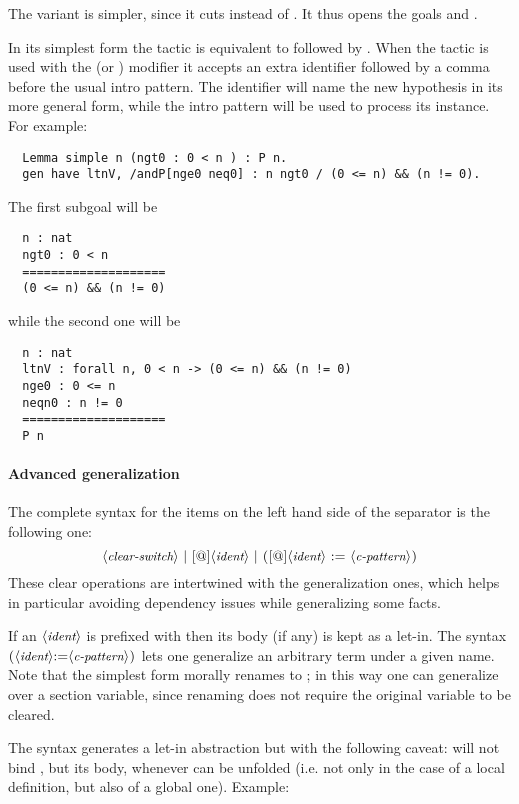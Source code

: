 The  variant is simpler, since it cuts
 instead of . It thus
opens the goals  and .

In its simplest form
the  tactic
is equivalent to  followed by .
When the  tactic
is used with the  (or ) modifier it accepts an
extra identifier followed by a comma before the usual intro pattern.
The identifier will name the new hypothesis in its more general form,
while the intro pattern will be used to process its instance.  For example:
\begin{lstlisting}
  Lemma simple n (ngt0 : 0 < n ) : P n.
  gen have ltnV, /andP[nge0 neq0] : n ngt0 / (0 <= n) && (n != 0).
\end{lstlisting}
The first subgoal will be
\begin{lstlisting}
  n : nat
  ngt0 : 0 < n
  ====================
  (0 <= n) && (n != 0)
\end{lstlisting}
while the second one will be
\begin{lstlisting}
  n : nat
  ltnV : forall n, 0 < n -> (0 <= n) && (n != 0)
  nge0 : 0 <= n
  neqn0 : n != 0
  ====================
  P n
\end{lstlisting}

\paragraph{Advanced generalization}\label{par:advancedgen}
The complete syntax for the items on the left hand side of the \C{/}
separator is the following one:
$$
\N{clear-switch}\ |\ [\C{@}]\N{ident}\ |\ \C{(}[\C{@}]\N{ident}\ \C{:=}\ \N{c-pattern}\C{)}
$$
These clear operations are intertwined with the generalization ones, which
helps in particular avoiding dependency issues while generalizing some facts.

\noindent
If an $\langle\mbox{\itshape\rmfamily\small ident}\rangle$ is prefixed with  then its body (if any) is kept as
a let-in.  The syntax $\C{(}\N{ident}\C{:=}\N{c-pattern}\C{)}$ lets one
generalize an arbitrary term under a given name.  Note that the simplest
form  morally renames  to ; in this way one can
generalize over a section variable, since renaming does not require
the original variable to be cleared.

\noindent
The syntax  generates a let-in abstraction but with the following
caveat:  will not bind , but its body, whenever  can be
unfolded (i.e. not only in the case of a local definition, but also of a
global one).  Example:

